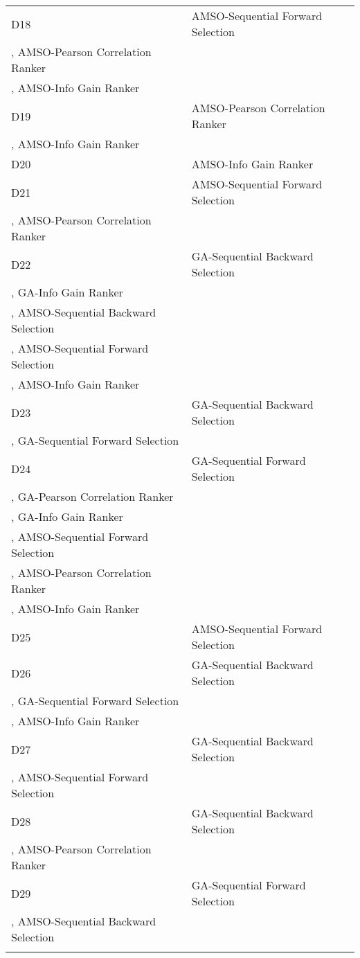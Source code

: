 \begin{table}
\begin{tabular}{ll}
D18&AMSO-Sequential Forward Selection\\
, AMSO-Pearson Correlation Ranker\\
, AMSO-Info Gain Ranker\\
D19&AMSO-Pearson Correlation Ranker\\
, AMSO-Info Gain Ranker\\
D20&AMSO-Info Gain Ranker\\
D21&AMSO-Sequential Forward Selection\\
, AMSO-Pearson Correlation Ranker\\
D22&GA-Sequential Backward Selection\\
, GA-Info Gain Ranker\\
, AMSO-Sequential Backward Selection\\
, AMSO-Sequential Forward Selection\\
, AMSO-Info Gain Ranker\\
D23&GA-Sequential Backward Selection\\
, GA-Sequential Forward Selection\\
D24&GA-Sequential Forward Selection\\
, GA-Pearson Correlation Ranker\\
, GA-Info Gain Ranker\\
, AMSO-Sequential Forward Selection\\
, AMSO-Pearson Correlation Ranker\\
, AMSO-Info Gain Ranker\\
D25&AMSO-Sequential Forward Selection\\
D26&GA-Sequential Backward Selection\\
, GA-Sequential Forward Selection\\
, AMSO-Info Gain Ranker\\
D27&GA-Sequential Backward Selection\\
, AMSO-Sequential Forward Selection\\
D28&GA-Sequential Backward Selection\\
, AMSO-Pearson Correlation Ranker\\
D29&GA-Sequential Forward Selection\\
, AMSO-Sequential Backward Selection\\
\noalign{\smallskip}\hline
\end{tabular}
\end{table}
